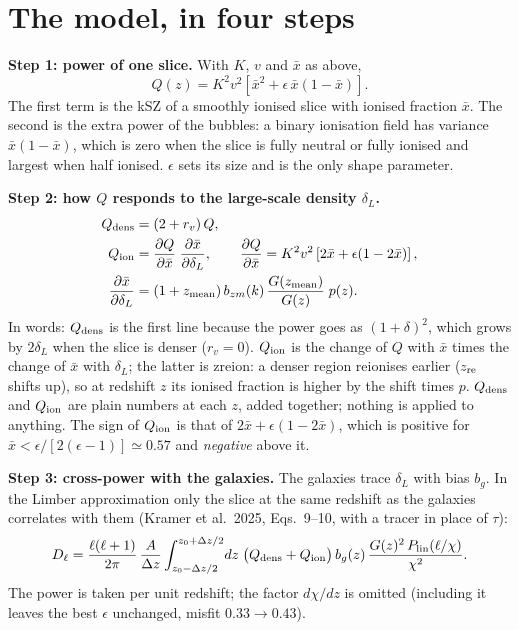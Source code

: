 \documentclass[10pt,a4paper]{article}
\newcommand{\xb}{\bar x}
\newcommand{\dens}{{\rm dens}}
\newcommand{\ion}{{\rm ion}}
\begin{document}
\section{The model, in four steps}
\textbf{Step 1: power of one slice.} With $K$, $v$ and $\bar x$ as above,
\begin{equation}
 Q(z)=K^2v^2\left[\xb^2+\epsilon\,\xb(1-\xb)\right].
\end{equation}
The first term is the kSZ of a smoothly ionised slice with ionised fraction $\xb$. The second is the extra power of the bubbles: a binary ionisation field has variance $\xb(1-\xb)$, which is zero when the slice is fully neutral or fully ionised and largest when half ionised. $\epsilon$ sets its size and is the only shape parameter.

\textbf{Step 2: how $Q$ responds to the large-scale density $\delta_L$.}
\begin{align}
 Q_\dens &= (2+r_v)\,Q, \\
 Q_\ion &= \frac{\partial Q}{\partial \xb}\;\frac{\partial \xb}{\partial\delta_L}, \qquad \frac{\partial Q}{\partial \xb}=K^2v^2\left[2\xb+\epsilon(1-2\xb)\right], \\
 \frac{\partial \xb}{\partial\delta_L} &=(1+z_{\rm mean})\,b_{zm}(k)\,\frac{G(z_{\rm mean})}{G(z)}\;p(z).
\end{align}
In words: $Q_\dens$ is the first line because the power goes as $(1+\delta)^2$, which grows by $2\delta_L$ when the slice is denser ($r_v=0$). $Q_\ion$ is the change of $Q$ with $\xb$ times the change of $\xb$ with $\delta_L$; the latter is zreion: a denser region reionises earlier ($z_{\rm re}$ shifts up), so at redshift $z$ its ionised fraction is higher by the shift times $p$.
$Q_\dens$ and $Q_\ion$ are plain numbers at each $z$, added together; nothing is applied to anything. The sign of $Q_\ion$ is that of $2\xb+\epsilon(1-2\xb)$, which is positive for $\xb<\epsilon/[2(\epsilon-1)]\simeq0.57$ and \emph{negative} above it.

\textbf{Step 3: cross-power with the galaxies.} The galaxies trace $\delta_L$ with bias $b_g$. In the Limber approximation only the slice at the same redshift as the galaxies correlates with them (Kramer et al.\ 2025, Eqs.~9--10, with a tracer in place of $\tau$):
\begin{equation}
 D_\ell=\frac{\ell(\ell+1)}{2\pi}\,\frac{A}{\Delta z}\int_{z_0-\Delta z/2}^{z_0+\Delta z/2}\!dz\;\big(Q_\dens+Q_\ion\big)\,b_g(z)\,\frac{G(z)^2\,P_{\rm lin}(\ell/\chi)}{\chi^2}.
\end{equation}
The power is taken per unit redshift; the factor $d\chi/dz$ is omitted (including it leaves the best $\epsilon$ unchanged, misfit $0.33\to0.43$).
\end{document}

